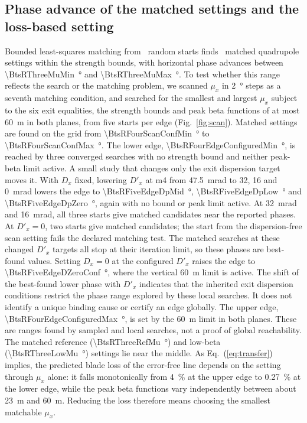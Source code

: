 \documentclass[final,5p,twocolumn]{elsarticle}
\begin{document}
\subsection{Phase advance of the matched settings and the loss-based setting}\label{sec:design}
Bounded least-squares matching from \BtsRThreePoolStarts\ random starts finds
\BtsRThreePoolSolutions\ matched quadrupole settings within the strength bounds, with horizontal
phase advances between \SI{\BtsRThreeMuMin}{\degree} and \SI{\BtsRThreeMuMax}{\degree}. To test whether this range
reflects the search or the matching problem, we scanned $\mu_x$ in \SI{2}{\degree} steps as a
seventh matching condition, and searched for the smallest and largest $\mu_x$
subject to the six exit equalities, the strength bounds and peak beta functions of
at most \SI{60}{\metre} in both planes, from five starts per edge (Fig.~\ref{fig:scan}).
Matched settings are found on the grid from \SI{\BtsRFourScanConfMin}{\degree} to \SI{\BtsRFourScanConfMax}{\degree}. The lower edge,
\SI{\BtsRFourEdgeConfiguredMin}{\degree}, is reached by three converged searches with no strength bound and neither
peak-beta limit active. A small study that changes only the exit dispersion target
moves it. With $D_x$ fixed, lowering $D'_x$ at m4 from \SI{47.5}{\milli\radian} to 32, 16 and
\SI{0}{\milli\radian} lowers the edge to \SI{\BtsRFiveEdgeDpMid}{\degree}, \SI{\BtsRFiveEdgeDpLow}{\degree} and \SI{\BtsRFiveEdgeDpZero}{\degree}, again with no bound
or peak limit active. At \SI{32}{\milli\radian} and \SI{16}{\milli\radian}, all three starts give
matched candidates near the reported phases. At $D'_x=0$, two starts give matched
candidates; the start from the dispersion-free scan setting fails the declared
matching test. The matched searches at these changed $D'_x$ targets all stop at
their iteration limit, so these phases are best-found values. Setting $D_x=0$ at the configured $D'_x$ raises the edge to
\SI{\BtsRFiveEdgeDZeroConf}{\degree}, where the vertical \SI{60}{\metre} limit is active. The shift of the best-found lower phase with $D'_x$ indicates
that the inherited exit dispersion conditions restrict the phase range explored
by these local searches. It does not identify a unique binding cause or certify
an edge globally. The upper edge,
\SI{\BtsRFourEdgeConfiguredMax}{\degree}, is set by the \SI{60}{\metre} limit in both planes. These are ranges
found by sampled and local searches, not a proof of global reachability. The
matched reference (\SI{\BtsRThreeRefMu}{\degree}) and low-beta (\SI{\BtsRThreeLowMu}{\degree}) settings lie near the
middle. As Eq.~(\ref{eq:transfer}) implies, the predicted blade loss of the error-free line
depends on the setting through $\mu_x$ alone: it falls monotonically from
\SI{4}{\percent} at the upper edge to \SI{0.27}{\percent} at the lower edge, while the peak beta
functions vary independently between about \SI{23}{\metre} and \SI{60}{\metre}. Reducing the loss
therefore means choosing the smallest matchable $\mu_x$.
\end{document}
